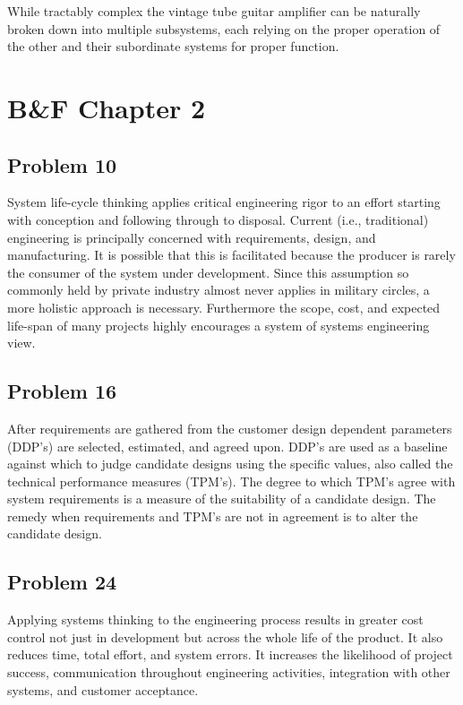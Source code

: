 \documentclass[letterpaper,10pt]{article}
\begin{document}
\par While tractably complex the vintage tube guitar amplifier can be naturally broken down into multiple subsystems, each relying on the proper operation of the other and their subordinate systems for proper function.

\section*{B\&F Chapter 2}
\subsection*{Problem 10}
System life-cycle thinking applies critical engineering rigor to an effort starting with conception and following through to disposal.  Current (i.e., traditional) engineering is principally concerned with requirements, design, and manufacturing.  It is possible that this is facilitated because the producer is rarely the consumer of the system under development.  Since this assumption so commonly held by private industry almost never applies in military circles, a more holistic approach is necessary.  Furthermore the scope, cost, and expected life-span of many projects highly encourages a system of systems engineering view.
\subsection*{Problem 16}
After requirements are gathered from the customer design dependent parameters (DDP's) are selected, estimated, and agreed upon.  DDP's are used as a baseline against which to judge candidate designs using the specific values, also called the technical performance measures (TPM's).  The degree to which TPM's agree  with system requirements is a measure of the suitability of a candidate design.  The remedy when requirements and TPM's are not in agreement is to alter the candidate design.
\subsection*{Problem 24}
Applying systems thinking to the engineering process results in greater cost control not just in development but across the whole life of the product.  It also reduces time, total effort, and system errors.  It increases the likelihood of project success, communication throughout engineering activities, integration with other systems, and customer acceptance.
\end{document}
